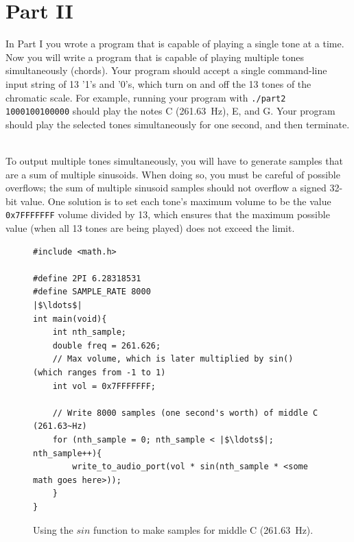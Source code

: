 \documentclass[epsfig,10pt,fullpage]{article}
\begin{document}
\noindent
\section*{Part II}

\noindent
In Part I you wrote a program that is capable of playing a single tone at a time. Now you will
write a program that is capable of playing multiple tones simultaneously (chords). Your program
should accept a single command-line input string of 13 '1's and '0's, 
which turn on and off the 13 tones
of the chromatic scale. For example, running your program with \texttt{./part2 1000100100000}
should play the notes C (261.63~Hz), E, and G. Your program should play the selected tones
simultaneously for one second, and then terminate. 

~\\
\noindent
To output multiple tones simultaneously, you will have to generate samples that are a sum of
multiple sinusoids. When doing so, you must be careful of possible overflows; the sum of multiple
sinusoid samples should not overflow a signed 32-bit value. One solution is to set 
each tone's maximum volume to be the value \texttt{0x7FFFFFFF} volume divided by 13, which ensures 
that the maximum possible value (when all 13 tones are being played) does not exceed the limit. 

\lstset{language=C,numbers=left,escapechar=|}
\begin{figure}[H]
\begin{center}
\begin{minipage}[t]{14.75 cm}
\begin{lstlisting}
#include <math.h>

#define 2PI 6.28318531
#define SAMPLE_RATE 8000
|$\ldots$|
int main(void){
	int nth_sample;
	double freq = 261.626;
	// Max volume, which is later multiplied by sin() (which ranges from -1 to 1)
	int vol = 0x7FFFFFFF; 

	// Write 8000 samples (one second's worth) of middle C (261.63~Hz)
	for (nth_sample = 0; nth_sample < |$\ldots$|; nth_sample++){
		write_to_audio_port(vol * sin(nth_sample * <some math goes here>));
	}
}
\end{lstlisting}
\end{minipage}
\end{center}
\vspace{-0.33in}\caption{Using the $sin$ function to make samples for middle C (261.63~Hz).}
\label{fig:sinusoid_code}
\end{figure}
\end{document}
